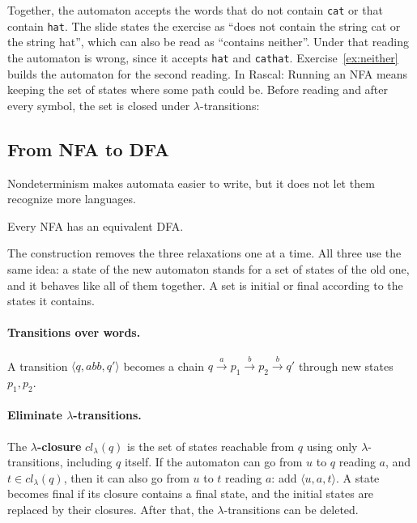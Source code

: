 Together, the automaton accepts the words that do not contain \texttt{cat}
or that contain \texttt{hat}. The slide states the exercise as ``does not
contain the string cat or the string hat'', which can also be read as
``contains neither''. Under that reading the automaton is wrong, since it
accepts \texttt{hat} and \texttt{cathat}. Exercise~\ref{ex:neither} builds
the automaton for the second reading. In Rascal:
Running an NFA means keeping the set of states where some path could be.
Before reading and after every symbol, the set is closed under
$\lambda$-transitions:

\subsection{From NFA to DFA}

Nondeterminism makes automata easier to write, but it does not let them
recognize more languages.

\begin{theorem}
Every NFA has an equivalent DFA.
\end{theorem}

The construction removes the three relaxations one at a time. All three use
the same idea: a state of the new automaton stands for a set of states of the
old one, and it behaves like all of them together. A set is initial or final
according to the states it contains.

\paragraph{Transitions over words.} A transition $\langle q, abb, q' \rangle$
becomes a chain $q \xrightarrow{a} p_1 \xrightarrow{b} p_2 \xrightarrow{b} q'$
through new states $p_1, p_2$.

\paragraph{Eliminate $\lambda$-transitions.} The \textbf{$\lambda$-closure}
$\mathit{cl}_\lambda(q)$ is the set of states reachable from $q$ using only
$\lambda$-transitions, including $q$ itself. If the automaton can go from $u$
to $q$ reading $a$, and $t \in \mathit{cl}_\lambda(q)$, then it can also go from
$u$ to $t$ reading $a$: add $\langle u, a, t \rangle$. A state becomes final if
its closure contains a final state, and the initial states are replaced by
their closures. After that, the $\lambda$-transitions can be deleted.


